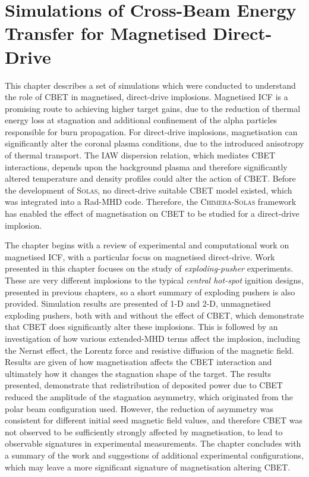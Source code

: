 \chapter{Simulations of Cross-Beam Energy Transfer for Magnetised Direct-Drive}

This chapter describes a set of simulations which were conducted to understand the role of \ac{CBET} in magnetised, direct-drive implosions.
Magnetised \ac{ICF} is a promising route to achieving higher target gains, due to the reduction of thermal energy loss at stagnation and additional confinement of the alpha particles responsible for burn propagation.
For direct-drive implosions, magnetisation can significantly alter the coronal plasma conditions, due to the introduced anisotropy of thermal transport.
The \ac{IAW} dispersion relation, which mediates \ac{CBET} interactions, depends upon the background plasma and therefore significantly altered temperature and density profiles could alter the action of \ac{CBET}.
Before the development of \textsc{Solas}, no direct-drive suitable \ac{CBET} model existed, which was integrated into a \ac{Rad-MHD} code.
Therefore, the \textsc{Chimera}-\textsc{Solas} framework has enabled the effect of magnetisation on \ac{CBET} to be studied for a direct-drive implosion.

The chapter begins with a review of experimental and computational work on magnetised \ac{ICF}, with a particular focus on magnetised direct-drive.
Work presented in this chapter focuses on the study of \textit{exploding-pusher} experiments.
These are very different implosions to the typical \textit{central hot-spot} ignition designs, presented in previous chapters, so a short summary of exploding pushers is also provided.
Simulation results are presented of 1-D and 2-D, unmagnetised exploding pushers, both with and without the effect of \ac{CBET}, which demonstrate that \ac{CBET} does significantly alter these implosions.
This is followed by an investigation of how various extended-\ac{MHD} terms affect the implosion, including the Nernst effect, the Lorentz force and resistive diffusion of the magnetic field.
Results are given of how magnetisation affects the \ac{CBET} interaction and ultimately how it changes the stagnation shape of the target.
The results presented, demonstrate that redistribution of deposited power due to \ac{CBET} reduced the amplitude of the stagnation asymmetry, which originated from the polar beam configuration used.
However, the reduction of asymmetry was consistent for different initial seed magnetic field values, and therefore \ac{CBET} was not observed to be sufficiently strongly affected by magnetisation, to lead to observable signatures in experimental measurements.
The chapter concludes with a summary of the work and suggestions of additional experimental configurations, which may leave a more significant signature of magnetisation altering \ac{CBET}.

